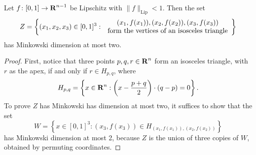 \begin{lemma}
	Let $f\colon [0,1] \to \operatorname{\mathbf{R}}^{n-1}$ be Lipschitz with $\| f \|_{\text{Lip}} < 1$. Then the set
	\[ Z = \left\{ (x_1,x_2,x_3) \in [0,1]^3\operatorname{\colon} \begin{array}{c} (x_1,f(x_1)), (x_2,f(x_2)), (x_3,f(x_3))\\
		\textrm{form the vertices of an isosceles triangle} \end{array} \right\} \]
	has Minkowski dimension at most two.
\end{lemma}
\begin{proof}
	First, notice that three points $p,q,r \in \operatorname{\mathbf{R}}^n$ form an isosceles triangle, with $r$ as the apex, if and only if $r \in H_{p,q}$, where
	\[ H_{p,q} = \left\{ x \in \operatorname{\mathbf{R}}^n : \left( x - \frac{p + q}{2} \right) \cdot (q - p) = 0 \right\}. \]
	To prove $Z$ has Minkowski has dimension at most two, it suffices to show that the set
	\[ W = \left\{ x \in [0,1]^3 : (x_3,f(x_3)) \in H_{(x_1,f(x_1)), (x_2,f(x_2))} \right\} \]
	has Minkowski dimension at most 2, because $Z$ is the union of three copies of $W$, obtained by permuting coordinates.


\end{proof}
